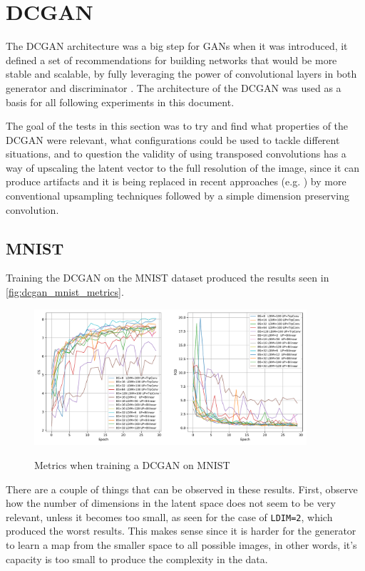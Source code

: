 \section{DCGAN}
The \gls{DCGAN} architecture was a big step for \acp{GAN} when it was introduced, it defined a set of recommendations for building networks that would be more stable and scalable, by fully leveraging the power of convolutional layers in both generator and discriminator \cite{dcgan2015}. The architecture of the \gls{DCGAN} was used as a basis for all following experiments in this document.

The goal of the tests in this section was to try and find what properties of the \gls{DCGAN} were relevant, what configurations could be used to tackle different situations, and to question the validity of using transposed convolutions has a way of upscaling the latent vector to the full resolution of the image, since it can produce artifacts \cite{deconvolutionArtifacts2016} and it is being replaced in recent approaches (e.g. \cite{styleGAN2018}) by more conventional upsampling techniques followed by a simple dimension preserving convolution.

\subsection{MNIST}
Training the \gls{DCGAN} on the \gls{MNIST} dataset produced the results seen in \autoref{fig:dcgan_mnist_metrics}.\begin{figure}[hbt]
    \centering
    \caption{Metrics when training a DCGAN on MNIST}
    \includegraphics[width=0.9\textwidth]{chapters/Experiments/DCGAN/mnist_metrics.pdf}
    \label{fig:dcgan_mnist_metrics}
\end{figure}

There are a couple of things that can be observed in these results. First, observe how the number of dimensions in the latent space does not seem to be very relevant, unless it becomes too small, as seen for the case of \texttt{LDIM=2}, which produced the worst results. This makes sense since it is harder for the generator to learn a map from the smaller space to all possible images, in other words, it's capacity is too small to produce the complexity in the data.

